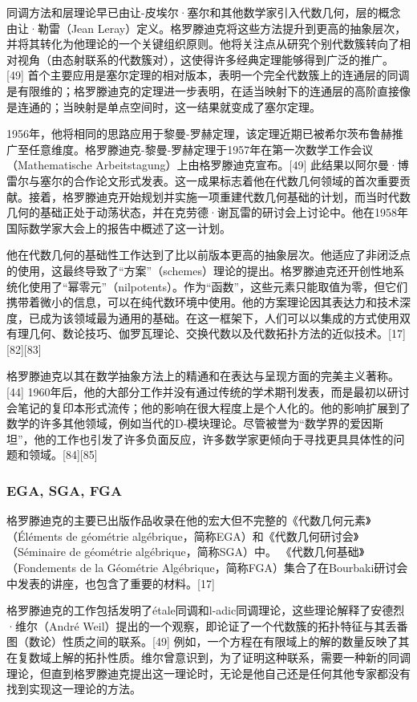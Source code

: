 同调方法和层理论早已由让-皮埃尔·塞尔和其他数学家引入代数几何，层的概念由让·勒雷（Jean Leray）定义。格罗滕迪克将这些方法提升到更高的抽象层次，并将其转化为他理论的一个关键组织原则。他将关注点从研究个别代数簇转向了相对视角（由态射联系的代数簇对），这使得许多经典定理能够得到广泛的推广。[49] 首个主要应用是塞尔定理的相对版本，表明一个完全代数簇上的连通层的同调是有限维的；格罗滕迪克的定理进一步表明，在适当映射下的连通层的高阶直接像是连通的；当映射是单点空间时，这一结果就变成了塞尔定理。

1956年，他将相同的思路应用于黎曼-罗赫定理，该定理近期已被希尔茨布鲁赫推广至任意维度。格罗滕迪克-黎曼-罗赫定理于1957年在第一次数学工作会议（Mathematische Arbeitstagung）上由格罗滕迪克宣布。[49] 此结果以阿尔曼·博雷尔与塞尔的合作论文形式发表。这一成果标志着他在代数几何领域的首次重要贡献。接着，格罗滕迪克开始规划并实施一项重建代数几何基础的计划，而当时代数几何的基础正处于动荡状态，并在克劳德·谢瓦雷的研讨会上讨论中。他在1958年国际数学家大会上的报告中概述了这一计划。

他在代数几何的基础性工作达到了比以前版本更高的抽象层次。他适应了非闭泛点的使用，这最终导致了“方案”（schemes）理论的提出。格罗滕迪克还开创性地系统化使用了“幂零元”（nilpotents）。作为“函数”，这些元素只能取值为零，但它们携带着微小的信息，可以在纯代数环境中使用。他的方案理论因其表达力和技术深度，已成为该领域最为通用的基础。在这一框架下，人们可以以集成的方式使用双有理几何、数论技巧、伽罗瓦理论、交换代数以及代数拓扑方法的近似技术。[17][82][83]

格罗滕迪克以其在数学抽象方法上的精通和在表达与呈现方面的完美主义著称。[44] 1960年后，他的大部分工作并没有通过传统的学术期刊发表，而是最初以研讨会笔记的复印本形式流传；他的影响在很大程度上是个人化的。他的影响扩展到了数学的许多其他领域，例如当代的D-模块理论。尽管被誉为“数学界的爱因斯坦”，他的工作也引发了许多负面反应，许多数学家更倾向于寻找更具具体性的问题和领域。[84][85]
\subsubsection{EGA, SGA, FGA}
格罗滕迪克的主要已出版作品收录在他的宏大但不完整的《代数几何元素》（Éléments de géométrie algébrique，简称EGA）和《代数几何研讨会》（Séminaire de géométrie algébrique，简称SGA）中。 《代数几何基础》（Fondements de la Géométrie Algébrique，简称FGA）集合了在Bourbaki研讨会中发表的讲座，也包含了重要的材料。[17]

格罗滕迪克的工作包括发明了étale同调和l-adic同调理论，这些理论解释了安德烈·维尔（André Weil）提出的一个观察，即论证了一个代数簇的拓扑特征与其丢番图（数论）性质之间的联系。[49] 例如，一个方程在有限域上的解的数量反映了其在复数域上解的拓扑性质。维尔曾意识到，为了证明这种联系，需要一种新的同调理论，但直到格罗滕迪克提出这一理论时，无论是他自己还是任何其他专家都没有找到实现这一理论的方法。

